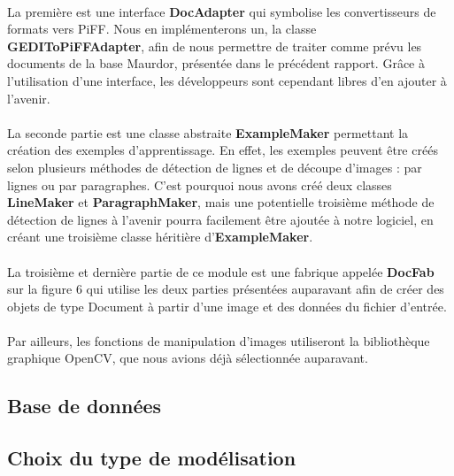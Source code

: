 \paragraph{}

La première est  une interface \textbf{DocAdapter} qui symbolise les
convertisseurs de formats vers PiFF. Nous en implémenterons un, la classe
\textbf{GEDIToPiFFAdapter}, afin de nous permettre de traiter comme prévu les
documents de la base Maurdor, présentée dans le précédent rapport. Grâce à
l’utilisation d’une interface, les développeurs sont cependant libres d’en
ajouter à l’avenir.

\paragraph{}

La seconde partie est une classe abstraite \textbf{ExampleMaker} permettant
la création des exemples d’apprentissage. En effet, les exemples peuvent être
créés selon plusieurs méthodes de détection de lignes et de découpe d’images :
par lignes ou par paragraphes. C’est pourquoi nous avons créé deux classes
\textbf{LineMaker} et \textbf{ParagraphMaker}, mais une potentielle troisième
méthode de détection de lignes à l’avenir pourra facilement être ajoutée à
notre logiciel, en créant une troisième classe héritière
d’\textbf{ExampleMaker}.

\paragraph{}

La troisième et dernière partie de ce module est une fabrique appelée
\textbf{DocFab} sur la figure 6 qui utilise les deux parties présentées
auparavant afin de créer des objets de type Document à partir d’une image et
des données du fichier d’entrée.

\paragraph{}

Par ailleurs, les fonctions de manipulation d’images utiliseront la bibliothèque graphique OpenCV, que nous avions déjà sélectionnée auparavant.

\subsection{Base de données}

\subsection{Choix du type de modélisation}

